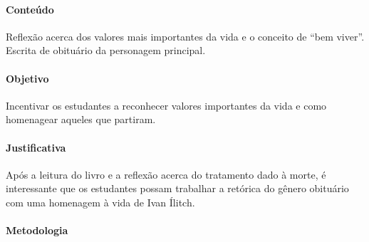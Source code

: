 \documentclass[12pt]{extarticle}
\begin{document}
\paragraph{Conteúdo} Reflexão acerca dos valores 
mais importantes da vida e o conceito de ``bem viver''.
Escrita de obituário da personagem principal.

\paragraph{Objetivo} Incentivar os estudantes a reconhecer
valores importantes da vida e como homenagear aqueles que partiram.

\paragraph{Justificativa} Após a leitura do livro e a reflexão acerca 
do tratamento dado à morte, é interessante que 
os estudantes possam trabalhar a retórica 
do gênero obituário com uma homenagem à vida de Ivan Ílitch.

\paragraph{Metodologia} 
\end{document}
